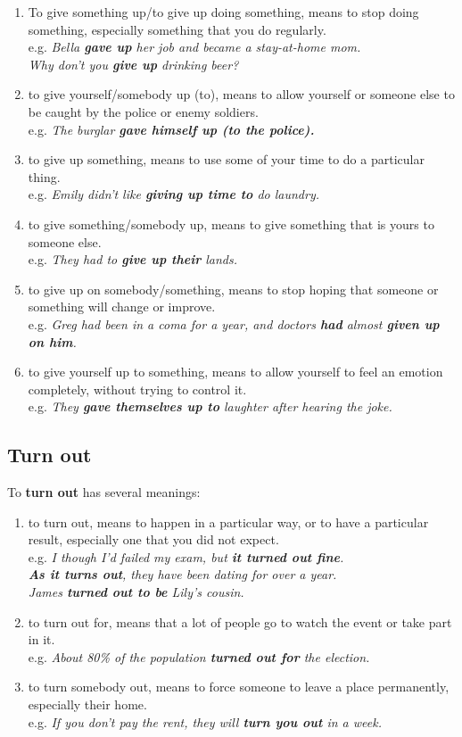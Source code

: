 \documentclass[hidelinks,10pt,a4paper]{article}
\begin{document}
\begin{enumerate}[label=(\alph*)]
	\item To give something up/to give up doing something, means to stop doing something, especially something that you do regularly. \\
		e.g. \textit{Bella \textbf{gave up} her job and became a stay-at-home mom. \\
		Why don't you \textbf{give up} drinking beer?}
	\item to give yourself/somebody up (to), means to allow yourself or someone else to be caught by the police or enemy soldiers. \\
		e.g. \textit{The burglar \textbf{gave himself up (to the police).} }
	\item to give up something, means to use some of your time to do a particular thing. \\
		e.g. \textit{Emily didn't like \textbf{giving up time to} do laundry.}
	\item to give something/somebody up, means to give something that is yours to someone else. \\
		e.g. \textit{They had to \textbf{give up their} lands.}
	\item to give up on somebody/something, means to stop hoping that someone or something will change or improve. \\
		e.g. \textit{Greg had been in a coma for a year, and doctors \textbf{had} almost \textbf{given up on him}.}
	\item to give yourself up to something, means to allow yourself to feel an emotion completely, without trying to control it. \\
		e.g. \textit{They \textbf{gave themselves up to} laughter after hearing the joke.}
\end{enumerate}

\subsection{Turn out}
To \textbf{turn out} has several meanings:

\begin{enumerate}[label=(\alph*)]
	\item to turn out, means to happen in a particular way, or to have a particular result, especially one that you did not expect. \\
		e.g. \textit{I though I'd failed my exam, but \textbf{it turned out fine}. \\
		\textbf{As it turns out}, they have been dating for over a year.\\
		James \textbf{turned out to be} Lily's cousin. }
	\item to turn out for, means that a lot of people go to watch the event or take part in it. \\
		e.g. \textit{About 80\% of the population \textbf{turned out for} the election.}
	\item to turn somebody out, means to force someone to leave a place permanently, especially their home. \\
		e.g. \textit{If you don't pay the rent, they will \textbf{turn you out} in a week. }
\end{enumerate}
\end{document}
